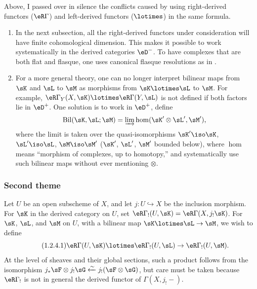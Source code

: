 \documentclass[oneside]{book}
\begin{document}
\subsubsection{}\label{IV:1-2-3}

Above, I passed over in silence the conflicts caused by using right-derived
functors ($\eR\Gamma$) and left-derived functors ($\lotimes$) in the same
formula.
\begin{enumerate}[\indent a)]
  \item In the next subsection, all the right-derived functors under
    consideration will have finite cohomological dimension. This makes it
    possible to work systematically in the derived categories $\eD^-$. To
    have complexes that are both flat and flasque, one uses canonical
    flasque resolutions as in \cite[XVII]{sga4}.
  \item For a more general theory, one can no longer interpret bilinear maps
    from $\sK$ and $\sL$ to $\sM$ as morphisms from
    $\sK\lotimes\sL$ to $\sM$. For example,
    $\eR\Gamma_Y(X,\sK)\lotimes\eR\Gamma(Y,\sL)$ is not defined if both
    factors lie in $\eD^+$. One solution is to work in $\eD^+$, define
    \[
      \operatorname{Bil}(\sK,\sL;\sM) = \varinjlim \hom(\sK'\otimes\sL',\sM') \text{,}
    \]
    where the limit is taken over the quasi-isomorphisms $\sK'\iso \sK$,
    $\sL'\iso \sL$, $\sM\iso \sM'$ ($\sK'$, $\sL'$, $\sM'$ bounded
    below), where $\hom$ means ``morphism of complexes, up to homotopy,'' and
    systematically use such bilinear maps without ever mentioning
    $\otimes$.
\end{enumerate}





\subsubsection{Second theme}\label{IV:1-2-4}

Let $U$ be an open subscheme of $X$, and let $j:U\hookrightarrow X$ be the
inclusion morphism. For $\sK$ in the derived category on $U$, set
$\eR\Gamma_!(U,\sK)=\eR\Gamma(X,j_!\sK)$. For $\sK$, $\sL$, and $\sM$ on
$U$, with a bilinear map $\sK\lotimes\sL\to\sM$, we wish to define
\begin{equation*}\tag{1.2.4.1}\label{IV:eq:1-2-4-1}
  \eR\Gamma(U,\sK)\lotimes\eR\Gamma_!(U,\sL)\to\eR\Gamma_!(U,\sM) \text{.}
\end{equation*}
At the level of sheaves and their global sections, such a product follows
from the isomorphism
$j_*\sF\otimes j_!\sG\xleftarrow\sim j_!(\sF\otimes \sG)$, but care must be
taken because $\eR\Gamma_!$ is not in general the derived functor of
$\Gamma(X,j_!-)$.
\end{document}
